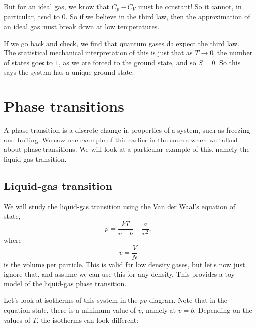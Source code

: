 \documentclass[a4paper]{article}
\begin{document}
But for an ideal gas, we know that $C_p - C_V$ must be constant! So it cannot, in particular, tend to $0$. So if we believe in the third law, then the approximation of an ideal gas must break down at low temperatures.

If we go back and check, we find that quantum gases do expect the third law. The statistical mechanical interpretation of this is just that as $T \to 0$, the number of states goes to $1$, as we are forced to the ground state, and so $S = 0$. So this says the system has a unique ground state.

\section{Phase transitions}
A phase transition is a discrete change in properties of a system, such as freezing and boiling. We saw one example of this earlier in the course when we talked about phase transitions. We will look at a particular example of this, namely the liquid-gas transition.

\subsection{Liquid-gas transition}
We will study the liquid-gas transition using the Van der Waal's equation of state,
\[
  p = \frac{kT}{v - b} - \frac{a}{v^2},
\]
where
\[
  v = \frac{V}{N}
\]
is the volume per particle. This is valid for low density gases, but let's now just ignore that, and assume we can use this for any density. This provides a toy model of the liquid-gas phase transition.

Let's look at isotherms of this system in the $pv$ diagram. Note that in the equation state, there is a minimum value of $v$, namely at $v = b$. Depending on the values of $T$, the isotherms can look different:
\end{document}
